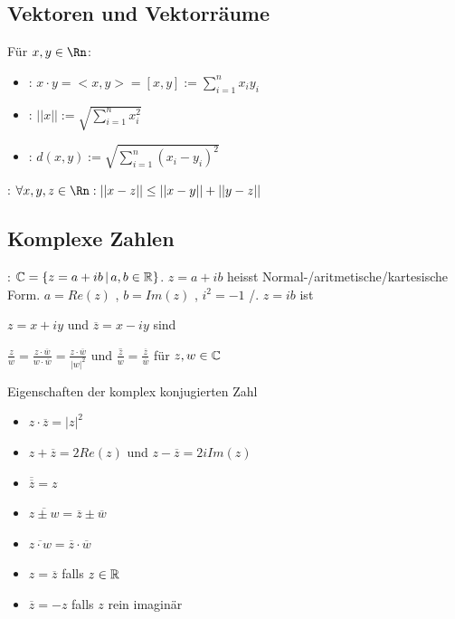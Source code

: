 \subsection{Vektoren und Vektorräume}

\Def Für $x, y \in \Rn$:
\vspace{-0.6em}
\begin{itemize}
    \item {}: $x \cdot y = <x,y> = [x,y] := \sum_{i=1}^{n}x_i y_i$
    \item {}: $||x|| := \sqrt{\sum_{i=1}^{n}x_i^2}$
    \item {}: $d(x,y) := \sqrt{\sum_{i=1}^{n}(x_i-y_i)^2}$
\end{itemize}

\Satz {}: $\forall x,y,z \in \Rn : ||x-z||\le ||x-y|| + ||y - z||$

\subsection{Komplexe Zahlen}

\Def {}: $\mathbb{C} = \{z = a + ib \, | \, a,b \in \mathbb{R}\}$.
$z = a + ib$ heisst Normal-/aritmetische/kartesische Form. $a = Re(z)$ ,
$b = Im(z)$ , $i^2 = -1$ /. $z = ib$ ist 

\Def $z = x + iy$ und $\overline{z} = x - iy$ sind 

\Satz $\frac{z}{w} = \frac{z \cdot \overline{w}}{w \cdot \overline{w}} = \frac{z \cdot \overline{w}}{|w|^2}$
und $\overline{\frac{z}{w}} = \frac{\overline{z}}{\overline{w}}$ für $z,w \in \mathbb{C}$

\Satz Eigenschaften der komplex konjugierten Zahl
\vspace{-0.6em}
\begin{itemize}
    \item $z \cdot \overline{z} = |z|^2$
    \item $z + \overline{z} = 2 Re(z)$ und $z - \overline{z} = 2iIm(z)$
    \item $\overline{\overline{z}} = z$
    \item $\overline{z \pm w} = \overline{z} \pm \overline{w}$
    \item $\overline{z \cdot w} = \overline{z} \cdot \overline{w}$
    \item $z = \overline{z}$ falls $z \in \mathbb{R}$
    \item $\overline{z} = -z$ falls $z$ rein imaginär
\end{itemize}

